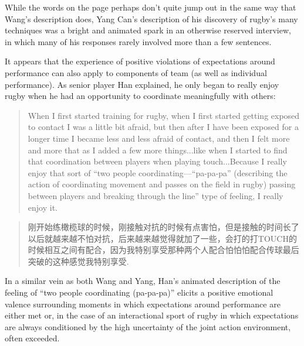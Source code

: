 \begin{CJK}{UTF8}{gbsn}
While the words on the page perhaps don't quite jump out in the same way that Wang's description does, Yang Can's description of his discovery of rugby's many techniques was a bright and animated spark in an otherwise reserved interview, in which many of his responses rarely involved more than a few sentences.

It appears that the experience of positive violations of expectations around performance can also apply to components of team (as well as individual performance).  As senior player Han explained, he only began to really enjoy rugby when he had an opportunity to coordinate meaningfully with others:

\begin{quotation}
    When I first started training for rugby, when I first started getting exposed to contact I was a little bit afraid, but then after I have been exposed for a longer time I became less and less afraid of contact, and then I felt more and more that as I added a few more things...like when I started to find that coordination between players when playing touch...Because I really enjoy that sort of ``two people coordinating---``pa-pa-pa'' (describing the action of coordinating movement and passes on the field in rugby) passing between players and breaking through the line'' type of feeling, I really enjoy it.
\end{quotation}

\begin{quotation}
  	刚开始练橄榄球的时候，刚接触对抗的时候有点害怕，但是接触的时间长了以后就越来越不怕对抗，后来越来越觉得就加了一些，会打的打TOUCH的时候相互之间有配合，因为我特别享受那种两个人配合怕怕怕配合传球最后突破的这种感觉我特别享受.
\end{quotation}

In a similar vein as both Wang and Yang, Han's animated description of the feeling of ``two people coordinating (pa-pa-pa)'' elicits a positive emotional valence surrounding moments in which expectations around performance are either met or, in the case of an interactional sport of rugby in which expectations are always conditioned by the high uncertainty of the joint action environment, often exceeded.


\end{CJK}

